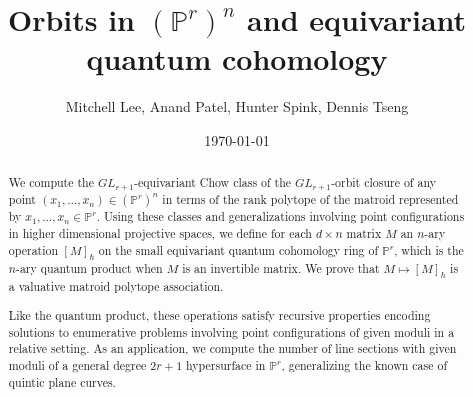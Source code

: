 \documentclass[12pt]{amsart}
\newcommand{\mb}{\mathbb}
\theoremstyle{plain}
\theoremstyle{definition}
\theoremstyle{remark}
\begin{document}
\title{Orbits in $(\mathbb{P}^r)^n$ and equivariant quantum cohomology}
\author{Mitchell Lee, Anand Patel, Hunter Spink, Dennis Tseng}
\date{\today}

\allowdisplaybreaks

\begin{abstract}

We compute the $GL_{r+1}$-equivariant Chow class of the $GL_{r+1}$-orbit closure of any point $(x_1, \ldots, x_n) \in (\mb{P}^r)^n$ in terms of the rank polytope of the matroid represented by $x_1, \ldots, x_n \in \mb{P}^r$. Using these classes and generalizations involving point configurations in higher dimensional projective spaces, we define for each $d\times n$ matrix $M$ an $n$-ary operation $[M]_\hbar$ on the small equivariant quantum cohomology ring of $\mb{P}^r$, which is the $n$-ary quantum product when $M$ is an invertible matrix. We prove that $M \mapsto [M]_\hbar$ is a valuative matroid polytope association.

Like the quantum product, these operations satisfy recursive properties encoding solutions to enumerative problems involving point configurations of given moduli in a relative setting. As an application, we compute the number of line sections with given moduli of a general degree $2r+1$ hypersurface in $\mb{P}^r$, generalizing the known case of quintic plane curves.
\end{abstract}

\maketitle
\end{document}
